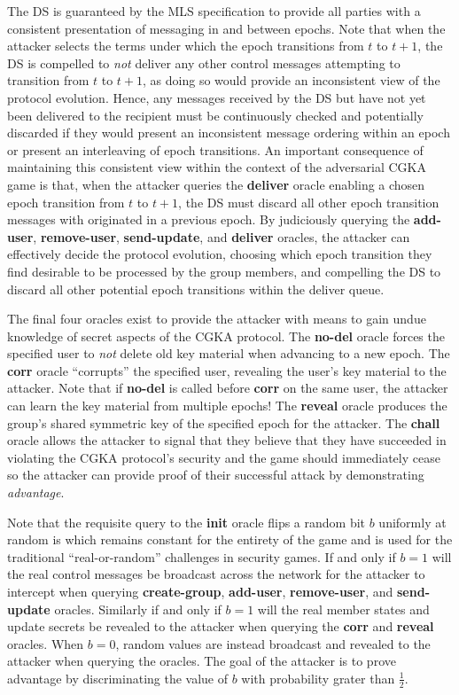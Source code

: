 The DS is guaranteed by the MLS specification to provide all parties with a consistent presentation of messaging in and between epochs.
Note that when the attacker selects the terms under which the epoch transitions from \(t\) to \(t+1\), the DS is compelled to \emph{not} deliver any other control messages attempting to transition from \(t\) to \(t+1\), as doing so would provide an inconsistent view of the protocol evolution.
Hence, any messages received by the DS but have not yet been delivered to the recipient must be continuously checked and potentially discarded if they would present an inconsistent message ordering within an epoch or present an interleaving of epoch transitions.
An important consequence of maintaining this consistent view within the context of the adversarial CGKA game is that, when the attacker queries the \textbf{deliver} oracle enabling a chosen epoch transition from \(t\) to \(t+1\), the DS must discard all other epoch transition messages with originated in a previous epoch.
By judiciously querying the \textbf{add-user}, \textbf{remove-user}, \textbf{send-update}, and \textbf{deliver} oracles, the attacker can effectively decide the protocol evolution, choosing which epoch transition they find desirable to be processed by the group members, and compelling the DS to discard all other potential epoch transitions within the deliver queue.

The final four oracles exist to provide the attacker with means to gain undue knowledge of secret aspects of the CGKA protocol.
The \textbf{no-del} oracle forces the specified user to \emph{not} delete old key material when advancing to a new epoch.
The \textbf{corr} oracle ``corrupts'' the specified user, revealing the user's key material to the attacker. Note that if \textbf{no-del} is called before \textbf{corr} on the same user, the attacker can learn the key material from multiple epochs!
The \textbf{reveal} oracle produces the group's shared symmetric key of the specified epoch for the attacker.
The \textbf{chall} oracle allows the attacker to signal that they believe that they have succeeded in violating the CGKA protocol's security and the game should immediately cease so the attacker can provide proof of their successful attack by demonstrating \emph{advantage}.

Note that the requisite query to the \textbf{init} oracle flips a random bit \(b\) uniformly at random is which remains constant for the entirety of the game and is used for the traditional ``real-or-random'' challenges in security games.
If and only if \(b=1\) will the real control messages be broadcast across the network for the attacker to intercept when querying \textbf{create-group}, \textbf{add-user}, \textbf{remove-user}, and \textbf{send-update} oracles.
Similarly if and only if \(b=1\) will the real member states and update secrets be revealed to the attacker when querying the \textbf{corr} and \textbf{reveal} oracles.
When \(b=0\), random values are instead broadcast and revealed to the attacker when querying the oracles.
The goal of the attacker is to prove advantage by discriminating the value of \(b\) with probability grater than \(\frac{1}{2}\).

